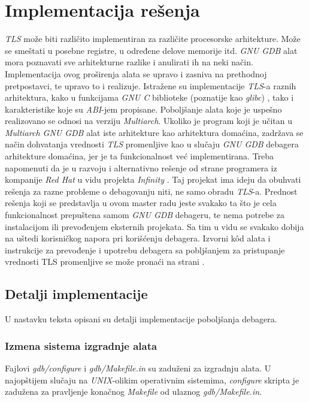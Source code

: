 \documentclass[12pt,oneside]{memoir}
\begin{document}
\chapter{Implementacija rešenja}
\label{chp:Implementacija}

\emph{TLS} može biti različito implementiran za različite procesorske arhitekture. Može se smeštati u posebne registre, u određene delove memorije itd. \emph{GNU GDB} alat mora poznavati sve arhitekturne razlike i anulirati ih na neki način. Implementacija ovog proširenja alata se upravo i zasniva na prethodnoj pretpostavci, te upravo to i realizuje. Istražene su implementacije \emph{TLS}-a raznih arhitektura, kako u funkcijama \emph{GNU C} biblioteke (poznatije kao \emph{glibc}) \cite{GLIBC}, tako i karakteristike koje su \emph{ABI}-jem propisane. Poboljšanje alata koje je uspešno realizovano se odnosi na verziju \emph{Multiarch}. Ukoliko je program koji je učitan u \emph{Multiarch GNU GDB} alat iste arhitekture kao arhitektura domaćina, zadržava se način dohvatanja vrednosti \emph{TLS} promenljive kao u slučaju \emph{GNU GDB} debagera arhitekture domaćina, jer je ta funkcionalnost već implementirana. Treba napomenuti da je u razvoju i alternativno rešenje od strane programera iz kompanije \emph{Red Hat} \cite{REDHAT} u vidu projekta \emph{Infinity} \cite{Infinity}. Taj projekat ima ideju da obuhvati rešenja za razne probleme o debagovanju niti, ne samo obradu \emph{TLS}-a. Prednost rešenja koji se predstavlja u ovom master radu jeste svakako ta što je cela funkcionalnost prepuštena samom \emph{GNU GDB} debageru, te nema potrebe za instalacijom ili prevođenjem eksternih projekata. Sa tim u vidu se svakako dobija na uštedi korisničkog napora pri korišćenju debagera. Izvorni k\^{o}d alata i instrukcije za prevođenje i upotrebu debagera sa pobljšanjem za pristupanje vrednosti TLS promenljive se može pronaći na strani \cite{GITMOJ}.

\section{Detalji implementacije}

U nastavku teksta opisani su detalji implementacije poboljšanja debagera.

\subsection{Izmena sistema izgradnje alata}

Fajlovi \emph{gdb/configure} i \emph{gdb/Makefile.in} su zaduženi za izgradnju alata. U najopštijem slučaju na \emph{UNIX}-olikim operativnim sistemima, \emph{configure} skripta je zadužena za pravljenje konačnog \emph{Makefile} od ulaznog \emph{gdb/Makefile.in}.
\end{document}

